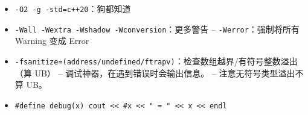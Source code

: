\begin{itemize}
	\item \texttt{-O2 -g -std=c++20}：狗都知道
	\item \texttt{-Wall -Wextra -Wshadow -Wconversion}：更多警告
		\subitem --\; \texttt{-Werror}：强制将所有 Warning 变成 Error
	\item \texttt{-fsanitize=(address/undefined/ftrapv)}：检查数组越界/有符号整数溢出（算 UB）
		\subitem --\; 调试神器，在遇到错误时会输出信息。
		\subitem --\; 注意无符号类型溢出不算 UB。
	\item \texttt{#define debug(x) cout << #x << " = " << x << endl}
\end{itemize}
